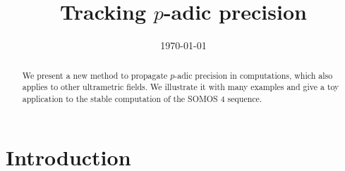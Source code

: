 \documentclass{lms}
\begin{document}
\newtheorem{theo}{Theorem}[section]
\newtheorem{lem}[theo]{Lemma}
\newtheorem{prop}[theo]{Proposition}
\newtheorem{cor}[theo]{Corollary}
\newtheorem{quest}[theo]{Question}
\newtheorem{rem}[theo]{Remark}
\newtheorem{ex}[theo]{Example}
\newtheorem{deftn}[theo]{Definition}
\newtheorem{rmk}[theo]{Remark}

\newcommand{\N}{\mathbb N}
\newcommand{\Z}{\mathbb Z}
\newcommand{\Zp}{\Z_p}
\newcommand{\Q}{\mathbb Q}
\newcommand{\Qp}{\Q_p}
\newcommand{\Fp}{\mathbb{F}_p}
\newcommand{\R}{\mathbb R}
\renewcommand{\O}{\mathcal O}
\newcommand{\OK}{\mathcal{O}_K}
\newcommand{\XX}{\mathbf X}
\newcommand{\trans}{{}^{\text t}}
\newcommand{\T}{\mathcal{T}}

\renewcommand{\prec}{\text{\rm prec}}

\newcommand{\lb}{\ensuremath{\llbracket}}
\newcommand{\rb}{\ensuremath{\rrbracket}}
\newcommand{\lp}{(\!(}
\newcommand{\rp}{)\!)}
\newcommand{\col}{\: : \:}

\def\todo#1{\ \!\!{\color{red} #1}}
\def\todofor#1#2{\ \!\!{\color{purple} {\bf #1}: #2}}

\title{Tracking $p$-adic precision}
\date\today

\maketitle
\begin{abstract}
We present a new method to propagate $p$-adic precision in computations, which also
applies to other ultrametric fields.
We illustrate it with many examples and give a toy application to the
stable computation of the SOMOS 4 sequence.
\end{abstract}

\setcounter{tocdepth}{1}
\tableofcontents

\section{Introduction}
\end{document}
